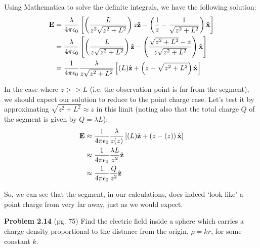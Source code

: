 \documentclass{article}
\begin{document}
Using Mathematica to solve the definite integrals, we have the following solution:
\begin{equation*}
\begin{aligned}
\vb{E} &= \frac{\lambda}{4\pi\epsilon_0}\left[\left(\frac{L}{z^2\sqrt{z^2+L^2}}\right)z\hat{\vb{z}} - \left(\frac{1}{z} - \frac{1}{\sqrt{z^2+L^2}} \right)\hat{\vb{x}}\right] \\
&= \frac{\lambda}{4\pi\epsilon_0}\left[\left(\frac{L}{z\sqrt{z^2+L^2}}\right)\hat{\vb{z}} - \left(\frac{\sqrt{z^2+L^2} - z}{z\sqrt{z^2+L^2}} \right)\hat{\vb{x}}\right] \\
&= \frac{1}{4\pi\epsilon_0}\frac{\lambda}{z\sqrt{z^2+L^2}}\left[(L)\hat{\vb{z}} + \left(z - \sqrt{z^2+L^2}\right)\hat{\vb{x}}\right]
\end{aligned}
\end{equation*}

In the case where $z >\!\!> L$ (i.e. the observation point is far from the segment), we should expect our solution to reduce to the point charge case. Let's test it by approximating $\sqrt{z^2+L^2} \approx z$ in this limit (noting also that the total charge $Q$ of the segment is given by $Q = \lambda L$):
\begin{equation*}
\begin{aligned}
\vb{E} &\approx \frac{1}{4\pi\epsilon_0}\frac{\lambda}{z(z)}\left[(L)\hat{\vb{z}} + \left(z - (z)\right)\hat{\vb{x}}\right] \\
&\approx \frac{1}{4\pi\epsilon_0}\frac{\lambda L}{z^2}\hat{\vb{z}} \\
&\approx \frac{1}{4\pi\epsilon_0}\frac{Q}{z^2}\hat{\vb{z}}
\end{aligned}
\end{equation*}

So, we can see that the segment, in our calculations, does indeed `look like' a point charge from very far away, just as we would expect.

\hrulefill

\textbf{Problem 2.14} (pg. 75) Find the electric field inside a sphere which carries a charge density proportional to the distance from the origin, $\rho = kr$, for some constant $k$.
\end{document}
